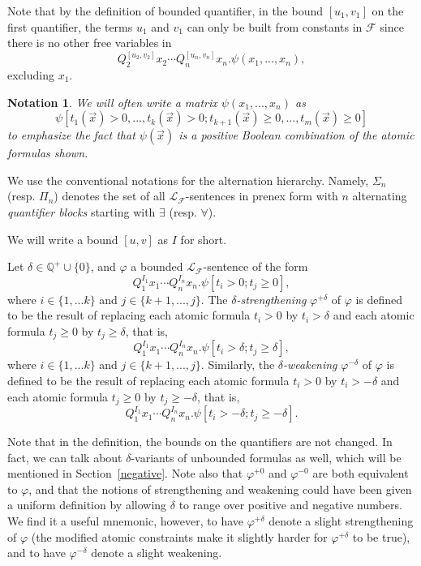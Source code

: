 \documentclass[envcountsect]{llncs}
\newtheorem{notation}[theorem]{Notation}
\begin{document}
\begin{remark} Note that by the definition of bounded quantifier, in the bound $[u_1,v_1]$ on the first quantifier, the terms $u_1$ and $v_1$ can only be built from constants in $\mathcal{F}$ since there is no other free variables in 
$$Q_2^{[u_2,v_2]}x_2\cdots Q_n^{[u_n,v_n]}x_n.\psi(x_1,...,x_n),$$ excluding $x_1$. 
\end{remark}


\begin{notation}
We will often write a matrix $\psi(x_1,...,x_n)$ as 
$$\psi[t_1(\vec x)>0,...,t_k(\vec x)>0; t_{k+1}(\vec x)\geq 0,...,t_m(\vec x)\geq 0]$$
to emphasize the fact that $\psi(\vec x)$ is a positive Boolean combination of the atomic formulas shown. 
\end{notation}

We use the conventional notations for the alternation hierarchy. Namely, $\Sigma_n$ (resp. $\Pi_n$) denotes the set of all $\mathcal{L}_{\mathcal{F}}$-sentences in prenex form with $n$ alternating {\em quantifier blocks} starting with $\exists$ (resp. $\forall$). 


We will write a bound $[u,v]$ as $I$ for short. 

\begin{definition}
Let $\delta\in \mathbb{Q}^+\cup\{0\}$, and $\varphi$ a bounded $\mathcal{L}_{\mathcal{F}}$-sentence of the form
$$Q_1^{I_1}x_1\cdots Q_n^{I_n}x_n.\psi[t_i>0; t_j\geq 0],$$
where $i\in\{1,...k\}$ and $j\in\{k+1,...,j\}$. The {\em $\delta$-strengthening} $\varphi^{+\delta}$ of $\varphi$ is defined to be the result of replacing each atomic formula $t_i > 0$ by $t_i > \delta$ and each atomic formula $t_j \geq 0$ by $t_j \geq \delta$, that is,
$$Q_1^{I_1}x_1\cdots Q_n^{I_n}x_n.\psi[t_i>\delta; t_j\geq \delta],$$
where $i\in\{1,...k\}$ and $j\in\{k+1,...,j\}$.
Similarly, the {\em $\delta$-weakening} $\varphi^{-\delta}$ of $\varphi$ is defined to be the result of replacing each atomic formula $t_i > 0$ by $t_i > -\delta$ and each atomic formula $t_j \geq 0$ by $t_j \geq -\delta$, that is,
$$Q_1^{I_1}x_1\cdots Q_n^{I_n}x_n.\psi[t_i>-\delta; t_j\geq -\delta].$$
\end{definition}

Note that in the definition, the bounds on the quantifiers are not changed. In fact, we can talk about $\delta$-variants of unbounded formulas as well, which will be mentioned in Section~\ref{negative}. Note also that $\varphi^{+0}$ and $\varphi^{-0}$ are both equivalent to $\varphi$, and that the notions of strengthening and weakening could have been given a uniform definition by allowing $\delta$ to range over positive and negative numbers. We find it a useful mnemonic, however, to have $\varphi^{+\delta}$ denote a slight strengthening of $\varphi$ (the modified atomic constraints make it slightly harder for $\varphi^{+\delta}$ to be true), and to have $\varphi^{-\delta}$ denote a slight weakening.
\end{document}
